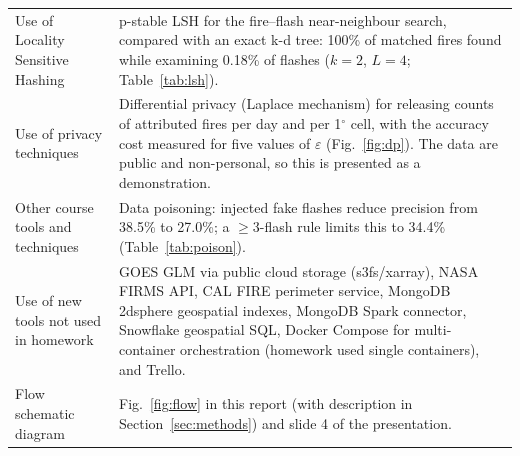 \documentclass[10pt,journal,compsoc]{IEEEtran}
\begin{document}
\begin{tabularx}{\textwidth}{@{}>{\raggedright\arraybackslash}p{3.6cm}>{\raggedright\arraybackslash}X@{}}
Use of Locality Sensitive Hashing & p-stable LSH for the fire--flash near-neighbour search, compared with an exact k-d tree: 100\% of matched fires found while examining 0.18\% of flashes ($k = 2$, $L = 4$; Table~\ref{tab:lsh}). \\
Use of privacy techniques & Differential privacy (Laplace mechanism) for releasing counts of attributed fires per day and per 1$^\circ$ cell, with the accuracy cost measured for five values of $\varepsilon$ (Fig.~\ref{fig:dp}). The data are public and non-personal, so this is presented as a demonstration. \\
Other course tools and techniques & Data poisoning: injected fake flashes reduce precision from 38.5\% to 27.0\%; a $\geq$3-flash rule limits this to 34.4\% (Table~\ref{tab:poison}). \\
Use of new tools not used in homework & GOES GLM via public cloud storage (s3fs/xarray), NASA FIRMS API, CAL FIRE perimeter service, MongoDB 2dsphere geospatial indexes, MongoDB Spark connector, Snowflake geospatial SQL, Docker Compose for multi-container orchestration (homework used single containers), and Trello. \\
Flow schematic diagram & Fig.~\ref{fig:flow} in this report (with description in Section~\ref{sec:methods}) and slide 4 of the presentation. \\
\bottomrule
\end{tabularx}
\end{document}
